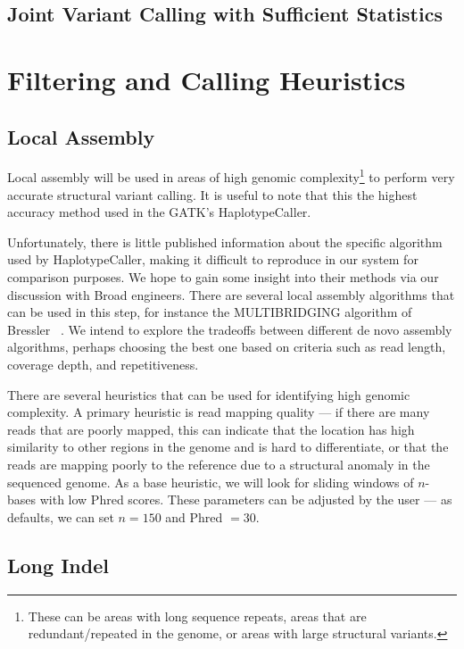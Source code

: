 \documentclass[11pt]{article}
\begin{document}
\subsection{Joint Variant Calling with Sufficient Statistics}
\label{sec:joint-variant-calling}

\section{Filtering and Calling Heuristics}
\label{sec:filtering-calling}

\subsection{Local Assembly}
\label{sec:local-assembly}

Local assembly will be used in areas of high genomic complexity\footnote{These can be areas with long sequence
repeats, areas that are redundant/repeated in the genome, or areas with large structural variants.} to perform very accurate
structural variant calling. It is useful to note that this the highest accuracy method used in the GATK's HaplotypeCaller.

Unfortunately, there is little published information about the specific algorithm used by HaplotypeCaller, making it difficult to
reproduce in our system for comparison purposes. We hope to gain some insight into their methods via our discussion with
Broad engineers. There are several local assembly algorithms that can be used in this step, for instance the MULTIBRIDGING
algorithm of Bressler ~\cite{bresler13}. We intend to explore the tradeoffs between different de novo assembly algorithms, 
perhaps choosing the best one based on criteria such as read length, coverage depth, and repetitiveness.

There are several heuristics that can be used for identifying high genomic complexity. A primary heuristic is read mapping
quality --- if there are many reads that are poorly mapped, this can indicate that the location has high similarity to other
regions in the genome and is hard to differentiate, or that the reads are mapping poorly to the reference due to a structural
anomaly in the sequenced genome. As a base heuristic, we will look for sliding windows of $n$-bases with low Phred scores.
These parameters can be adjusted by the user --- as defaults, we can set $n = 150$ and Phred $= 30$.

\subsection{Long Indel}
\label{sec:long-indel}
\end{document}
